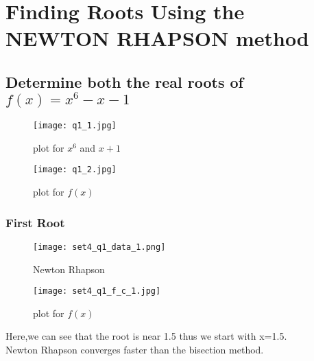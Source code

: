 \documentclass[a4paper]{article}
\begin{document}
\section{Finding Roots Using the NEWTON RHAPSON method}
    \subsection{Determine both the real roots of $f(x) = x^6 − x − 1$}
            \begin{figure}[!htbp]
              \centering
              \begin{minipage}[b]{0.45\textwidth}
                \texttt{[image: q1\_1.jpg]}
                \caption{plot for $x^6$ and $ x+1$}
              \end{minipage}
              \hfill
              \begin{minipage}[b]{0.45\textwidth}
                \texttt{[image: q1\_2.jpg]}
                \caption{plot for $f(x)$}
              \end{minipage}
            \end{figure}
            
            
        \subsubsection{First Root}
            \begin{figure}[!htbp]
              \centering
              \begin{minipage}[b]{0.45\textwidth}
\texttt{[image: set4\_q1\_data\_1.png]}
                \caption{Newton Rhapson }
              \end{minipage}
              \hfill
              \begin{minipage}[b]{0.45\textwidth}
\texttt{[image: set4\_q1\_f\_c\_1.jpg]}
                \caption{plot for $f(x)$}
              \end{minipage}
            \end{figure}
            \Large{Here,we can see that the root is near 1.5 thus we start with x=1.5.\\Newton Rhapson converges faster than the bisection method.}
            
            \newpage
\end{document}
